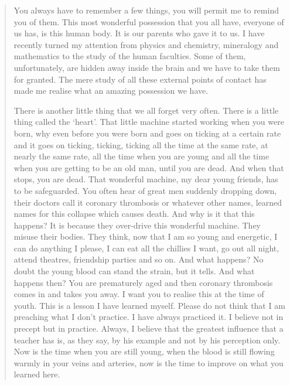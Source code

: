 \begin{quote}
{You always have to remember a few things, you will permit me to remind you of them. This most wonderful possession that you all have, everyone of us has, is this human body. It is our parents who gave it to us. I have recently turned my attention from physics and chemistry, mineralogy and mathematics to the study of the human faculties. Some of them, unfortunately, are hidden away inside the brain and we have to take them for granted. The mere study of all these external points of contact has made me realise what an amazing possession we have.

There is another little thing that we all forget very often. There is a little thing called the `heart'. That little machine started working when you were born, why even before you were born and goes on ticking at a certain rate and it goes on ticking, ticking, ticking all the time at the same rate, at nearly the same rate, all the time when you are young and all the time when you are getting to be an old man, until you are dead. And when that stops, you are dead. That wonderful machine, my dear young friends, has to be safeguarded. You often hear of great men suddenly dropping down, their doctors call it coronary thrombosis or whatever other names, learned names for this collapse which causes death. And why is it that this happens? It is because they over-drive this wonderful machine. They misuse their bodies. They think, now that I am so young and energetic, I can do anything I please, I can eat all the chillies I want, go out all night, attend theatres, friendship parties and so on. And what happens? No doubt the young blood can stand the strain, but it tells. And what happens then? You are prematurely aged and then coronary thrombosis comes in and takes you away. I want you to realise this at the time of youth. This is a lesson I have learned myself. Please do not think that I am preaching what I don't practice. I have always practiced it. I believe not in precept but in practice. Always, I believe that the greatest influence that a teacher has is, as they say, by his example and not by his perception only. Now is the time when you are still young, when the blood is still flowing warmly in your veins and arteries, now is the time to improve on what you learned here.

}
\end{quote}
